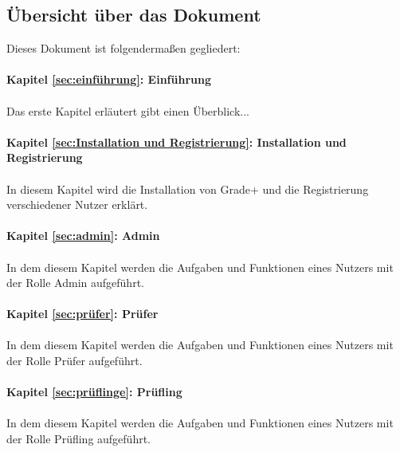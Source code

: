 \subsection{Übersicht über das Dokument}
Dieses Dokument ist folgendermaßen gegliedert:\\
\\
\textbf{Kapitel \ref{sec:einführung}: Einführung} %
\\
\\
{  Das erste Kapitel erläutert gibt einen Überblick...}
\\
\\

\textbf{Kapitel \ref{sec:Installation und Registrierung}: Installation und Registrierung} %
\\
\\
{ In diesem Kapitel wird die Installation von Grade+  und die Registrierung verschiedener Nutzer erklärt.}
\\
\\

\textbf{Kapitel \ref{sec:admin}: Admin} %
\\
\\
{In dem diesem Kapitel werden die Aufgaben und Funktionen eines Nutzers mit der Rolle Admin aufgeführt.}
\\
\\

\textbf{Kapitel \ref{sec:prüfer}: Prüfer} %
\\
\\
{In dem diesem Kapitel werden die Aufgaben und Funktionen eines Nutzers mit der Rolle Prüfer aufgeführt.}
\\
\\

\textbf{Kapitel \ref{sec:prüflinge}: Prüfling} %
\\
\\
{In dem diesem Kapitel werden die Aufgaben und Funktionen eines Nutzers mit der Rolle Prüfling aufgeführt.}
\\
\\
